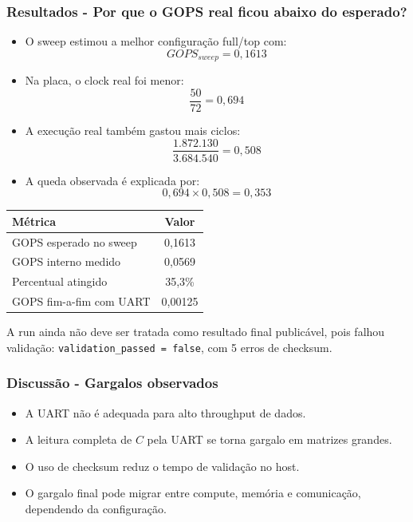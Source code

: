 \documentclass{beamer}
\begin{document}
\begin{frame}
\frametitle{Resultados - Por que o GOPS real ficou abaixo do esperado?}

\small

\begin{itemize}
    \item O sweep estimou a melhor configuração full/top com:
    \[
        GOPS_{sweep} = 0{,}1613
    \]

    \item Na placa, o clock real foi menor:
    \[
        \frac{50}{72} = 0{,}694
    \]

    \item A execução real também gastou mais ciclos:
    \[
        \frac{1.872.130}{3.684.540} = 0{,}508
    \]

    \item A queda observada é explicada por:
    \[
        0{,}694 \times 0{,}508 = 0{,}353
    \]
\end{itemize}

\vspace{0.1cm}

\begin{center}
\begin{tabular}{lc}
\toprule
\textbf{Métrica} & \textbf{Valor} \\
\midrule
GOPS esperado no sweep & 0,1613 \\
GOPS interno medido & 0,0569 \\
Percentual atingido & 35,3\% \\
GOPS fim-a-fim com UART & 0,00125 \\
\bottomrule
\end{tabular}
\end{center}

\vspace{0.05cm}

{\scriptsize
A run ainda não deve ser tratada como resultado final publicável, pois falhou validação:
\texttt{validation\_passed = false}, com 5 erros de checksum.
}

\end{frame}

\begin{frame}
\frametitle{Discussão - Gargalos observados}

\begin{itemize}
    \item A UART não é adequada para alto throughput de dados.
    \item A leitura completa de \(C\) pela UART se torna gargalo em matrizes grandes.
    \item O uso de checksum reduz o tempo de validação no host.
    \item O gargalo final pode migrar entre compute, memória e comunicação, dependendo da configuração.
\end{itemize}

\end{frame}
\end{document}

